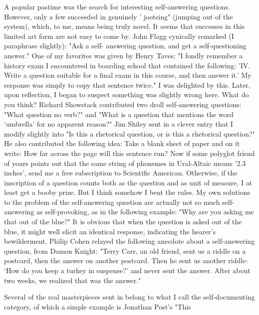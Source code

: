 A popular pastime was the search for interesting self-answering questions. However, only a few succeeded in genuinely ' jootsing" (jumping out of the system), which, to me, means being truly novel. It seems that successes in this limited art form are not easy to come by. John Flagg cynically remarked (I paraphrase slightly): "Ask a self- answering question, and get a self-questioning answer." One of my favorites was given by Henry Taves: "I fondly remember a history exam I encountered in boarding school that contained the following: 'IV. Write a question suitable for a final exam in this course, and then answer it.' My response was simply to copy that sentence twice." I was delighted by this. Later, upon reflection, I began to suspect something was slightly wrong here. What do you think? Richard Showstack contributed two droll self-answering questions: "What question no verb?" and "What is a question that mentions the word `umbrella' for no apparent reason?" Jim Shiley sent in a clever entry that I modify slightly into "Is this a rhetorical question, or is this a rhetorical question?" He also contributed the following idea: 
Take a blank sheet of paper and on it write: 
How far across the page will this sentence run? 
Now if some polyglot friend of yours points out that the same string of phonemes in Ural-Altaic means '2.3 inches', send me a free subscription to Scientific American. Otherwise, if the inscription of a question counts both as the question and as unit of measure, I at least get a booby prize. But I think somehow I bent the rules. 
My own solutions to the problem of the self-answering question are actually not so much self-answering as self-provoking, as in the following example: "Why are you asking me that out of the blue?" It is obvious that when the question is asked out of the blue, it might well elicit an identical response, indicating the hearer's bewilderment. Philip Cohen relayed the following anecdote about a self-answering question, from Damon Knight: "Terry Carr, an old friend, sent us a riddle on a postcard, then the answer on another postcard. Then he sent us another riddle: `How do you keep a turkey in suspense?' and never sent the answer. After about two weeks, we realized that was the answer." 
\separator

Several of the real masterpieces sent in belong to what I call the self-documenting category, of which a simple example is Jonathan Post's "This 


